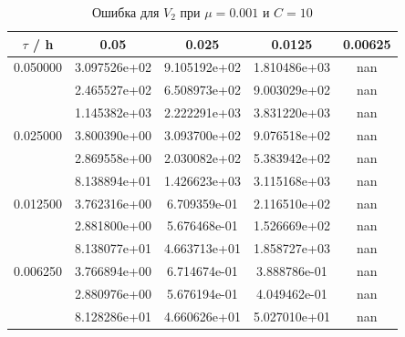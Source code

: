 \documentclass[specialist,subf,href,colorlinks=true,12pt
,times,mtpro,specialist
]{disser}
\begin{document}
\begin{table}[H]
\small
\caption{Ошибка для $V_2$ при $\mu=0.001$ и $C = 10$}
\begin{center}
\begin{tabular}{|c|c|c|c|c|}
\hline
$\tau$ / h & 0.05 & 0.025 & 0.0125 & 0.00625 \\
\hline
0.050000 & 3.097526e+02  & 9.105192e+02  & 1.810486e+03  & nan \\
 & 2.465527e+02  & 6.508973e+02  & 9.003029e+02  & nan \\
 & 1.145382e+03  & 2.222291e+03  & 3.831220e+03  & nan \\
\hline
0.025000 & 3.800390e+00  & 3.093700e+02  & 9.076518e+02  & nan \\
 & 2.869558e+00  & 2.030082e+02  & 5.383942e+02  & nan \\
 & 8.138894e+01  & 1.426623e+03  & 3.115168e+03  & nan \\
\hline
0.012500 & 3.762316e+00  & 6.709359e-01  & 2.116510e+02  & nan \\
 & 2.881800e+00  & 5.676468e-01  & 1.526669e+02  & nan \\
 & 8.138077e+01  & 4.663713e+01  & 1.858727e+03  & nan \\
\hline
0.006250 & 3.766894e+00  & 6.714674e-01  & 3.888786e-01  & nan \\
 & 2.880976e+00  & 5.676194e-01  & 4.049462e-01  & nan \\
 & 8.128286e+01  & 4.660626e+01  & 5.027010e+01  & nan \\
\hline
\end{tabular}
\end{center}
\end{table}
\end{document}
